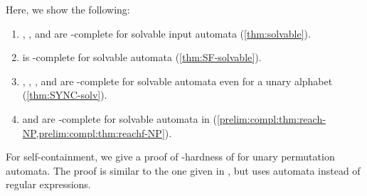 
Here, we show the following:

\begin{enumerate}
	\item \ST, \DST, and \DFAINT are \NP-complete for solvable input automata
	(\cref{thm:solvable}).
	
	\item \SFS is \NP-complete for solvable automata (\cref{thm:SF-solvable}).
	
	\item \DFAST, \DFASS, \DFAS, and \SIS are \LOGSPACE-complete
	for solvable automata even for a unary alphabet (\cref{thm:SYNC-solv}).
	
	\item \REACHF and \REACH are \NP-complete for solvable automata
	in (\cref{prelim:compl:thm:reach-NP,prelim:compl:thm:reachf-NP}).
\end{enumerate}
For self-containment, we give a proof of \NP-hardness of \DFAINT 
for unary permutation automata. The proof is similar to the one given in \cite[Lem.~27]{MartensN07},
but uses automata instead of regular expressions.

